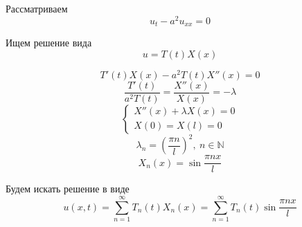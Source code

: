 \documentclass[a4paper]{article}
\theoremstyle{definition}
\theoremstyle{remark}
\begin{document}
Рассматриваем
\[
    u_t - a^2 u_{xx} = 0
\]

Ищем решение вида
\[
    u = T(t) X(x)
\]

\[
    T'(t) X(x) - a^2 T(t) X''(x) = 0
\]
\[
    \frac{T'(t)}{a^2 T(t)} = \frac{X''(x)}{X(x)} = -\lambda
\]
\[
    \begin{cases}
        X''(x) + \lambda X(x) = 0\\
        X(0) = X(l) = 0
    \end{cases}
\]
\[
    \lambda_n = \left( \frac{\pi n}{l} \right)^2, \ n \in \mathbb{N}
\]
\[
    X_n(x) = \sin \frac{\pi n x}{l} 
\]

Будем искать решение в виде
\[
    u(x,t) = \sum_{n=1}^{\infty} T_n(t) X_n(x) = \sum_{n=1}^{\infty} T_n(t)
    \sin \frac{\pi n x}{l}
\]
\end{document}
